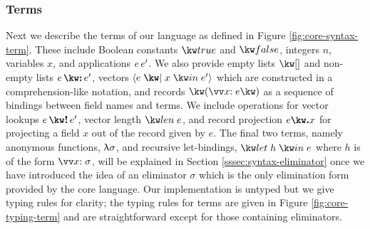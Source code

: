 \subsubsection{Terms}
Next we describe the terms of our language as defined in Figure \ref{fig:core-syntax-term}.  These include Boolean constants $\exTrue$ and $\exFalse$, integers $n$, variables $x$, and applications ${e}\,{e'}$. We also provide empty lists $\exNil$ and non-empty lists $\exCons{e}{e'}$, vectors $\exVec{e}{x}{e'}$ which are constructed in a comprehension-like notation, and records $\exRec{\vec{\bind{x}{e}}}$ as a sequence of bindings between field names and terms. We include operations for vector lookups $\exVecLookup{e}{e'}$, vector length $\exVecLen{e}$, and record projection $\exRecProj{e}{x}$ for projecting a field $x$ out of the record given by $e$. The final two terms, namely anonymous functions, $\uplambda{\sigma}$, and recursive let-bindings, $\exLetRecMutual{h}{e}$ where $h$ is of the form $\vec{\bind{x}{\sigma}}$, will be explained in Section \ref{sssec:syntax-eliminator} once we have introduced the idea of an eliminator $\sigma$ which is the only elimination form provided by the core language. Our implementation is untyped but we give typing rules for clarity; the typing rules for terms are given in Figure \ref{fig:core-typing-term} and are straightforward except for those containing eliminators.




\noindent

